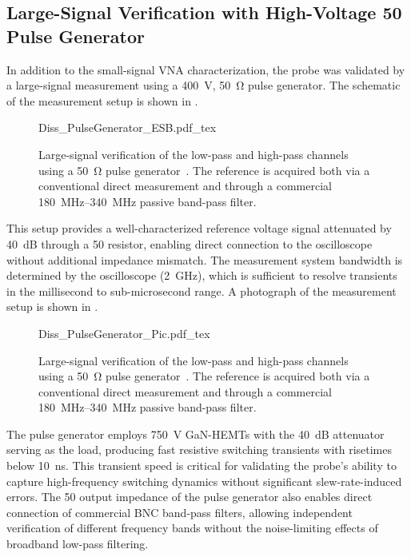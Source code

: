 \subsection*{Large-Signal Verification with High-Voltage \SI{50}{\Omega} Pulse Generator}
In addition to the small-signal VNA characterization, the probe was validated by a large-signal measurement using a \SI{400}{V}, \SI{50}{\ohm} pulse generator.
The schematic of the measurement setup is shown in .

\begin{figure}[ht]
	\centering
	{Diss_PulseGenerator_ESB.pdf_tex}
	\caption{Large-signal verification of the low-pass and high-pass channels using a \SI{50}{\ohm} pulse generator~\cite{kragl_active_2025}. The reference is acquired both via a conventional direct measurement and through a commercial \SI{180}{MHz}--\SI{340}{MHz} passive band-pass filter.}\label{fig:MS_PulsGen_ESB}
\end{figure}

This setup provides a well-characterized reference voltage signal attenuated by \SI{40}{dB} through a \SI{50}{\Omega} resistor, enabling direct connection to the oscilloscope without additional impedance mismatch.
The measurement system bandwidth is determined by the oscilloscope (\SI{2}{GHz}), which is sufficient to resolve transients in the millisecond to sub-microsecond range.
A photograph of the measurement setup is shown in .

\begin{figure}[ht]
	\centering
	{Diss_PulseGenerator_Pic.pdf_tex}
	\caption{Large-signal verification of the low-pass and high-pass channels using a \SI{50}{\ohm} pulse generator~\cite{kragl_active_2025}. The reference is acquired both via a conventional direct measurement and through a commercial \SI{180}{MHz}--\SI{340}{MHz} passive band-pass filter.}\label{fig:MS_PulsGen_Pic}
\end{figure}

The pulse generator employs \SI{750}{V} GaN-HEMTs with the \SI{40}{dB} attenuator serving as the load, producing fast resistive switching transients with risetimes below \SI{10}{ns}.
This transient speed is critical for validating the probe's ability to capture high-frequency switching dynamics without significant slew-rate-induced errors.
The \SI{50}{\Omega} output impedance of the pulse generator also enables direct connection of commercial BNC band-pass filters, allowing independent verification of different frequency bands without the noise-limiting effects of broadband low-pass filtering.


